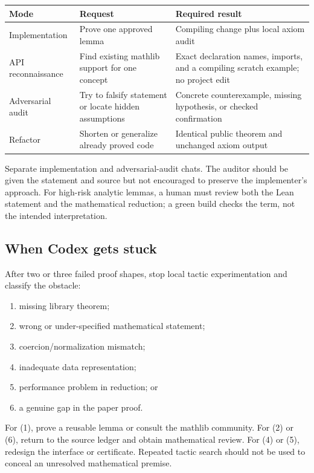 \documentclass[11pt]{article}
\begin{document}
\begin{longtable}{p{}p{}p{}}
\toprule
Mode & Request & Required result \\
\midrule
Implementation & Prove one approved lemma & Compiling change plus local axiom
audit \\
API reconnaissance & Find existing mathlib support for one concept & Exact
declaration names, imports, and a compiling scratch example; no project edit \\
Adversarial audit & Try to falsify statement or locate hidden assumptions &
Concrete counterexample, missing hypothesis, or checked confirmation \\
Refactor & Shorten or generalize already proved code & Identical public theorem
and unchanged axiom output \\
\bottomrule
\end{longtable}

Separate implementation and adversarial-audit chats.  The auditor should be
given the statement and source but not encouraged to preserve the implementer's
approach.  For high-risk analytic lemmas, a human must review both the Lean
statement and the mathematical reduction; a green build checks the term, not
the intended interpretation.

\subsection{When Codex gets stuck}

After two or three failed proof shapes, stop local tactic experimentation and
classify the obstacle:

\begin{enumerate}
\item missing library theorem;
\item wrong or under-specified mathematical statement;
\item coercion/normalization mismatch;
\item inadequate data representation;
\item performance problem in reduction; or
\item a genuine gap in the paper proof.
\end{enumerate}

For (1), prove a reusable lemma or consult the mathlib community.  For (2) or
(6), return to the source ledger and obtain mathematical review.  For (4) or
(5), redesign the interface or certificate.  Repeated tactic search should not
be used to conceal an unresolved mathematical premise.
\end{document}
